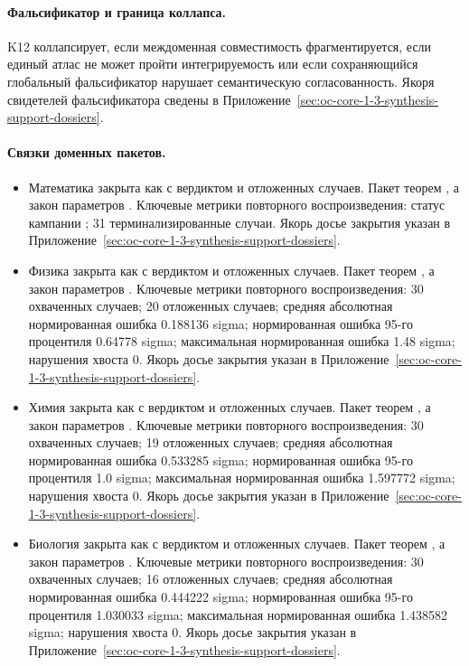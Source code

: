 \paragraph{Фальсификатор и граница коллапса.}
K12 коллапсирует, если междоменная совместимость фрагментируется, если единый атлас не может пройти интегрируемость или если сохраняющийся глобальный фальсификатор нарушает семантическую согласованность.
Якоря свидетелей фальсификатора сведены в Приложение~\ref{sec:oc-core-1-3-synthesis-support-dossiers}.

\paragraph{Связки доменных пакетов.}
\begin{itemize}[leftmargin=1.6em,nosep]
\item Математика закрыта как  с вердиктом  и  отложенных случаев. Пакет теорем , а закон параметров . Ключевые метрики повторного воспроизведения: статус кампании ; 31 терминализированные случаи. Якорь досье закрытия указан в Приложение~\ref{sec:oc-core-1-3-synthesis-support-dossiers}.
\item Физика закрыта как  с вердиктом  и  отложенных случаев. Пакет теорем , а закон параметров . Ключевые метрики повторного воспроизведения: 30 охваченных случаев; 20 отложенных случаев; средняя абсолютная нормированная ошибка 0.188136 sigma; нормированная ошибка 95-го процентиля 0.64778 sigma; максимальная нормированная ошибка 1.48 sigma; нарушения хвоста 0. Якорь досье закрытия указан в Приложение~\ref{sec:oc-core-1-3-synthesis-support-dossiers}.
\item Химия закрыта как  с вердиктом  и  отложенных случаев. Пакет теорем , а закон параметров . Ключевые метрики повторного воспроизведения: 30 охваченных случаев; 19 отложенных случаев; средняя абсолютная нормированная ошибка 0.533285 sigma; нормированная ошибка 95-го процентиля 1.0 sigma; максимальная нормированная ошибка 1.597772 sigma; нарушения хвоста 0. Якорь досье закрытия указан в Приложение~\ref{sec:oc-core-1-3-synthesis-support-dossiers}.
\item Биология закрыта как  с вердиктом  и  отложенных случаев. Пакет теорем , а закон параметров . Ключевые метрики повторного воспроизведения: 30 охваченных случаев; 16 отложенных случаев; средняя абсолютная нормированная ошибка 0.444222 sigma; нормированная ошибка 95-го процентиля 1.030033 sigma; максимальная нормированная ошибка 1.438582 sigma; нарушения хвоста 0. Якорь досье закрытия указан в Приложение~\ref{sec:oc-core-1-3-synthesis-support-dossiers}.

\end{itemize}
